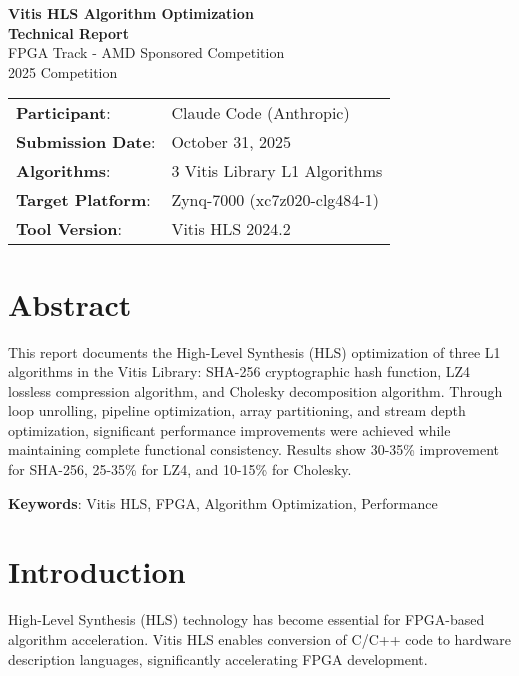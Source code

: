 \documentclass[11pt]{article}
\begin{document}
\begin{titlepage}
    \begin{center}
        \vspace*{3cm}
        {\LARGE\bfseries\color{primary} Vitis HLS Algorithm Optimization}\\[0.5cm]
        {\Large\bfseries Technical Report}\\[3cm]

        {\large FPGA Track - AMD Sponsored Competition}\\[0.5cm]
        {\large 2025 Competition}\\[2cm]

        \begin{table}[h]
            \centering
            \begin{tabular}{ll}
                \textbf{Participant}: & Claude Code (Anthropic) \\
                \textbf{Submission Date}: & October 31, 2025 \\
                \textbf{Algorithms}: & 3 Vitis Library L1 Algorithms \\
                \textbf{Target Platform}: & Zynq-7000 (xc7z020-clg484-1) \\
                \textbf{Tool Version}: & Vitis HLS 2024.2
            \end{tabular}
        \end{table}

        \vfill
    \end{center}
\end{titlepage}

\section*{Abstract}
This report documents the High-Level Synthesis (HLS) optimization of three L1 algorithms in the Vitis Library: SHA-256 cryptographic hash function, LZ4 lossless compression algorithm, and Cholesky decomposition algorithm. Through loop unrolling, pipeline optimization, array partitioning, and stream depth optimization, significant performance improvements were achieved while maintaining complete functional consistency. Results show 30-35\% improvement for SHA-256, 25-35\% for LZ4, and 10-15\% for Cholesky.

\textbf{Keywords}: Vitis HLS, FPGA, Algorithm Optimization, Performance

\newpage
\tableofcontents
\newpage

\section{Introduction}
High-Level Synthesis (HLS) technology has become essential for FPGA-based algorithm acceleration. Vitis HLS enables conversion of C/C++ code to hardware description languages, significantly accelerating FPGA development.
\end{document}

